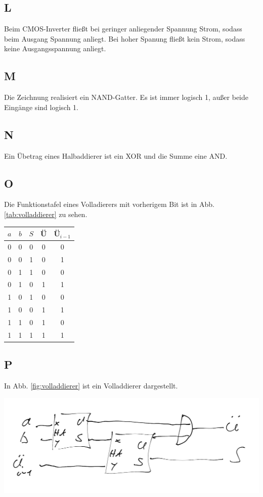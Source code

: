 \documentclass[10pt]{article}
\newenvironment{Figure}
  {\par\medskip\noindent\minipage{\linewidth}}
  {\endminipage\par\medskip}
\begin{document}
\begin{multicols}{2}
	\subsection*{L}
	Beim CMOS-Inverter fließt bei geringer anliegender Spannung Strom, sodass beim Ausgang Spannung anliegt. Bei hoher Spanung fließt kein Strom, sodass keine Ausgangsspannung anliegt.
	\subsection*{M}
	Die Zeichnung realisiert ein NAND-Gatter. Es ist immer logisch 1, außer beide Eingänge sind logisch 1.
	\subsection*{N}
	Ein Übetrag eines Halbaddierer ist ein XOR und die Summe eine AND.
	\subsection*{O}
	Die Funktionstafel eines Volladierers mit vorherigem Bit ist in Abb. \ref{tab:volladdierer} zu sehen.
	\begin{center}
		\begin{tabular}{|c|c|c|c|c|}
			\hline
			$a$ & $b$ & $S$ & Ü & Ü$_{i-1}$ \\
			\hline
			0   & 0   & 0   & 0 & 0         \\
			0   & 0   & 1   & 0 & 1         \\
			0   & 1   & 1   & 0 & 0         \\
			0   & 1   & 0   & 1 & 1         \\
			1   & 0   & 1   & 0 & 0         \\
			1   & 0   & 0   & 1 & 1         \\
			1   & 1   & 0   & 1 & 0         \\
			1   & 1   & 1   & 1 & 1         \\
			\hline
		\end{tabular}
		\label{tab:volladdierer}
	\end{center}

	\subsection*{P}
	In Abb. \ref{fig:volladdierer} ist ein Volladdierer dargestellt.
	\begin{Figure}
		\centering
		\includegraphics[width=1\textwidth]{volladdierer.png}
		\label{fig:volladdierer}
	\end{Figure}


\end{multicols}
\end{document}
